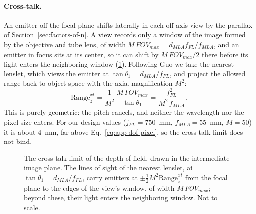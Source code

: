 \paragraph{Cross-talk.} An emitter off the focal plane shifts laterally in each off-axis view by the parallax of Section~\ref{sec:factors-of-n}. A view records only a window of the image formed by the objective and tube lens, of width $M\,FOV_{max}=d_{MLA}f_{FL}/f_{MLA}$, and an emitter in focus sits at its center, so it can shift by $M\,FOV_{max}/2$ there before its light enters the neighboring window (\cref{fig:app-crosstalk}). Following Guo we take the nearest lenslet, which views the emitter at $\tan\theta_1=d_{MLA}/f_{FL}$, and project the allowed range back to object space with the axial magnification $M^2$:
\begin{equation}
    \mathrm{Range}_{z}^{xt}
    = \frac{1}{M^2}\,\frac{M\,FOV_{max}}{\tan\theta_1}
    = \frac{f_{FL}^2}{M^2\,f_{MLA}}.
    \label{eq:app-dof-crosstalk}
\end{equation}
This is purely geometric: the pitch cancels, and neither the wavelength nor the pixel size enters. For our design values ($f_{FL}=750$~mm, $f_{MLA}=55$~mm, $M=50$) it is about 4~mm, far above Eq.~\eqref{eq:app-dof-pixel}, so the cross-talk limit does not bind.

\begin{figure}[tbp]
    \centering
    \resizebox{0.75\textwidth}{!}{}
    \caption{The cross-talk limit of the depth of field, drawn in the intermediate image plane. The lines of sight of the nearest lenslet, at $\tan\theta_1=d_{MLA}/f_{FL}$, carry emitters at $\pm\frac{1}{2}M^2\mathrm{Range}_z^{xt}$ from the focal plane to the edges of the view's window, of width $M\,FOV_{max}$; beyond these, their light enters the neighboring window. Not to scale.}
    \label{fig:app-crosstalk}
\end{figure}

